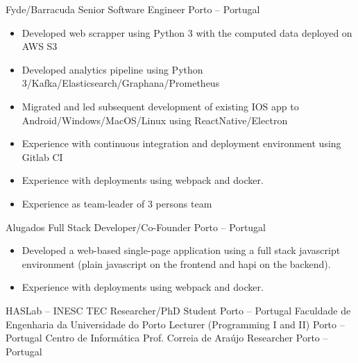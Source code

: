 \documentclass[11pt, a4paper]{awesome-cv}
\begin{document}
\begin{cventries}
  \cventry
  {Fyde/Barracuda}
  {Senior Software Engineer}
  {Porto -- Portugal}
  {}
  {
    \begin{itemize}
      \item Developed web scrapper using Python 3 with the computed data deployed on AWS S3
      \item Developed analytics pipeline using Python 3/Kafka/Elasticsearch/Graphana/Prometheus
      \item Migrated and led subsequent development of existing IOS app to Android/Windows/MacOS/Linux using ReactNative/Electron
      \item Experience with continuous integration and deployment environment using Gitlab CI
      \item Experience with deployments using webpack and docker.
      \item Experience as team-leader of 3 persons team
    \end{itemize}
  }
  \cventry
  {Alugados}
  {Full Stack Developer/Co-Founder}
  {Porto -- Portugal}
  {}
  {
    \begin{itemize}
    \item Developed a web-based single-page application using a full stack javascript environment (plain javascript on the frontend and hapi on the backend).
    \item Experience with deployments using webpack and docker.
    \end{itemize}
  }
  \cventry
  {HASLab -- INESC TEC}
  {Researcher/PhD Student}
  {Porto -- Portugal}
  {}
  {}
   \cventry
  {Faculdade de Engenharia da Universidade do Porto}
  {Lecturer (Programming I and II)}
  {Porto -- Portugal}
  {}
  {}
  \cventry
  {Centro de Informática Prof. Correia de Araújo}
  {Researcher}
  {Porto -- Portugal}
  {}
  {}
\end{cventries}
\end{document}
